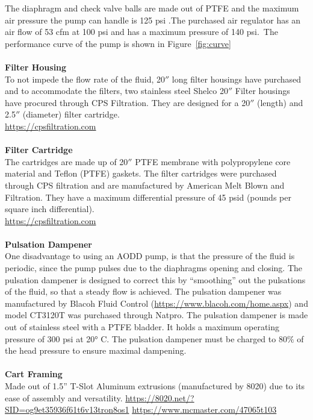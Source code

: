 The diaphragm and check valve balls are made out of PTFE and the maximum air pressure the pump can handle is 125 psi .The purchased air regulator has an air flow of 53 cfm at 100 psi and has a maximum pressure of 140 psi.\ The performance curve of the pump is shown in Figure~\ref{fig:curve} \\
 \\
 \textbf{Filter Housing}\\
To not impede the flow rate of the fluid, 20$''$ long filter housings have purchased and to accommodate the filters, two stainless steel Shelco 20$''$  Filter housings have procured through CPS Filtration. They are designed for a 20$''$ (length) and 2.5$''$  (diameter) filter cartridge.\\
\url{ https://cpsfiltration.com}\\
\\
\textbf{Filter Cartridge}\\
The cartridges are made up of 20$''$ PTFE membrane with polypropylene core material and Teflon (PTFE) gaskets.  The filter cartridges were purchased through CPS filtration and  are manufactured by American Melt Blown and Filtration. They have a maximum differential pressure of 45 psid (pounds per square inch differential).\\
\url{  https://cpsfiltration.com}\\
\\
\textbf{Pulsation Dampener}\\
One disadvantage to using an AODD pump, is that the pressure of the fluid is periodic, since the pump pulses due to the diaphragms opening and closing. The pulsation dampener is designed to correct this by “smoothing” out the pulsations of the fluid, so that a steady flow is achieved. The pulsation dampener was manufactured by Blacoh Fluid Control (\url{https://www.blacoh.com/home.aspx}) and  model CT3120T was purchased through Natpro. The pulsation dampener is made out of stainless steel with a PTFE bladder.  It holds a maximum operating pressure of 300 psi at \ang{20} C. The pulsation dampener must be charged to 80$\%$ of the head pressure to ensure maximal dampening.\\
\\
\textbf{Cart Framing}\\
Made out of 1.5” T-Slot Aluminum extrusions (manufactured by 8020) due to its ease of assembly and versatility. 
\url{https://8020.net/?SID=og9et35936f61t6v13tron8os1}
\url{https://www.mcmaster.com/47065t103}    \\
